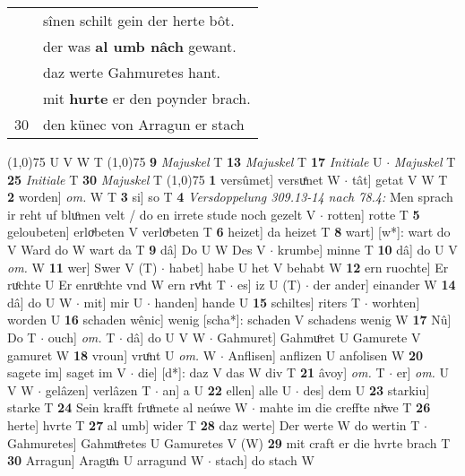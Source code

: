 \documentclass[8pt,a4paper,notitlepage]{article}
\begin{document}
\begin{table}[ht]
\begin{minipage}[t]{0.5\linewidth}
\begin{tabular}{rl}
 & sînen schilt gein der herte bôt.\\ 
 & der was \textbf{al umb nâch} gewant.\\ 
 & daz werte Gahmuretes hant.\\ 
 & mit \textbf{hurte} er den poynder brach.\\ 
30 & den künec von Arragun er stach\\ 
\end{tabular}
\scriptsize
\line(1,0){75} \newline
U V W T \newline
\line(1,0){75} \newline
\textbf{9} \textit{Majuskel} T  \textbf{13} \textit{Majuskel} T  \textbf{17} \textit{Initiale} U   $\cdot$ \textit{Majuskel} T  \textbf{25} \textit{Initiale} T  \textbf{30} \textit{Majuskel} T  \newline
\line(1,0){75} \newline
\textbf{1} versûmet] versuͤnet W  $\cdot$ tât] getat V W T \textbf{2} worden] \textit{om.} W T \textbf{3} si] so T \textbf{4} \textit{Versdoppelung 309.13-14 nach 78.4:} Men sprach ir reht uf bluͦmen velt / do en irrete stude noch gezelt V   $\cdot$ rotten] rotte T \textbf{5} geloubeten] erloͮbeten V verloͮbeten T \textbf{6} heizet] da heizet T \textbf{8} wart] [w*]: wart do V Ward do W wart da T \textbf{9} dâ] Do U W Des V  $\cdot$ krumbe] minne T \textbf{10} dâ] do U V \textit{om.} W \textbf{11} wer] Swer V (T)  $\cdot$ habet] habe U het V behabt W \textbf{12} ern ruochte] Er ruͦchte U Er enruͦchte vnd W ern rvͦht T  $\cdot$ es] iz U (T)  $\cdot$ der ander] einander W \textbf{14} dâ] do U W  $\cdot$ mit] mir U  $\cdot$ handen] hande U \textbf{15} schiltes] riters T  $\cdot$ worhten] worden U \textbf{16} schaden wênic] wenig [scha*]: schaden V schadens wenig W \textbf{17} Nû] Do T  $\cdot$ ouch] \textit{om.} T  $\cdot$ dâ] do U V W  $\cdot$ Gahmuret] Gahmuͦret U Gamurete V gamuret W \textbf{18} vroun] vruͦnt U \textit{om.} W  $\cdot$ Anflisen] anflizen U anfolisen W \textbf{20} sagete im] saget im V  $\cdot$ die] [d*]: daz V das W div T \textbf{21} âvoy] \textit{om.} T  $\cdot$ er] \textit{om.} U V W  $\cdot$ gelâzen] verlâzen T  $\cdot$ an] a U \textbf{22} ellen] alle U  $\cdot$ des] dem U \textbf{23} starkiu] starke T \textbf{24} Sein krafft fruͦmete al neúwe W  $\cdot$ mahte im die creffte niͮwe T \textbf{26} herte] hvrte T \textbf{27} al umb] wider T \textbf{28} daz werte] Der werte W do wertin T  $\cdot$ Gahmuretes] Gahmuͦretes U Gamuretes V (W) \textbf{29} mit craft er die hvrte brach T \textbf{30} Arragun] Araguͦn U arragund W  $\cdot$ stach] do stach W \newline
\end{minipage}
\end{table}
\end{document}
